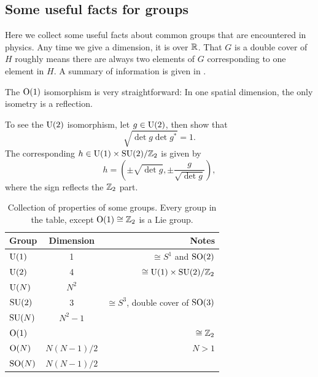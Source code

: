 \subsection{Some useful facts for groups}

Here we collect some useful facts about common groups that are encountered
in physics. Any time we give a dimension, it is over $\mathbb{R}$. 
That $G$ is a double cover of $H$ roughly means there are always two 
elements of $G$ corresponding to one element in
$H$. A summary of information is given in .

The $\operatorname{\text{O}}(1)$ isomorphism is very straightforward: In one spatial dimension, the
only isometry is a reflection.

To see the $\operatorname{U}(2)$ isomorphism, let $g\in\operatorname{U}(2)$, then show that
\begin{equation}
\sqrt{\det g\det g^*}=1.
\end{equation} 
The corresponding
$h\in \operatorname{U}(1)\times \operatorname{SU}(2)/\mathbb{Z}_2$ is given by
\begin{equation}
h=\left(\pm\sqrt{\det g},\pm\frac{g}{\sqrt{\det g}}\right),
\end{equation} 
where the sign reflects the $\mathbb{Z}_2$ part.

\begin{table}
\centering
\caption{Collection of properties of some groups.
Every group in the table, except $\operatorname{\text{O}}(1)\cong\mathbb{Z}_2$
is a Lie group. }
\begin{tabularx}{\linewidth}{lCr}
\hline\hline
Group & Dimension & Notes\\
\hline
$\operatorname{U}(1)$  & 1          & $\cong S^1$ and $\operatorname{SO}(2)$\\
$\operatorname{U}(2)$  & 4          & $\cong \operatorname{U}(1)\times \operatorname{SU}(2)/\mathbb{Z}_2$\\
$\operatorname{U}(N)$  & $N^2$      & \\ 
$\operatorname{SU}(2)$ & 3          & $\cong S^3$, double cover of $\operatorname{SO}(3)$\\
$\operatorname{SU}(N)$ & $N^2-1$    & \\
$\operatorname{\text{O}}(1)$ &            & $\cong\mathbb{Z}_2$\\
$\operatorname{\text{O}}(N)$ & $N(N-1)/2$ & $N>1$\\
$\operatorname{SO}(N)$ & $N(N-1)/2$ & \\
\hline\hline
\end{tabularx}
\label{tab:lie}
\end{table}




 
